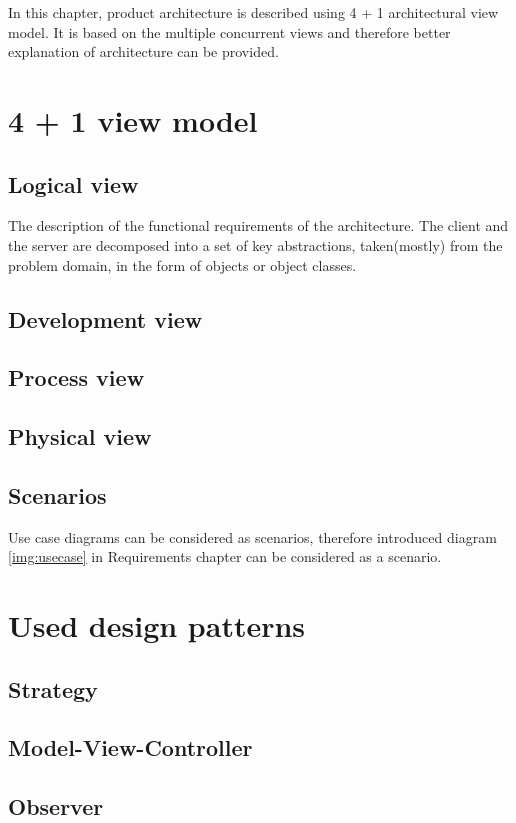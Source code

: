 In this chapter, product architecture is described using 4 + 1 architectural view model.
It is based on the multiple concurrent views and therefore better explanation of architecture can be provided.

\section{4 + 1 view model}
\subsection{Logical view}
The description of the functional requirements of the architecture. The client and the server are decomposed into a set of key abstractions, taken(mostly) from the problem domain, in the form of objects or object classes.
\subsection{Development view}
\subsection{Process view}
\subsection{Physical view}
\subsection{Scenarios}
Use case diagrams can be considered as scenarios, therefore introduced diagram \ref{img:usecase} in Requirements chapter can be considered as a scenario.

\section{Used design patterns}
\subsection{Strategy}
\subsection{Model-View-Controller}
\subsection{Observer}
